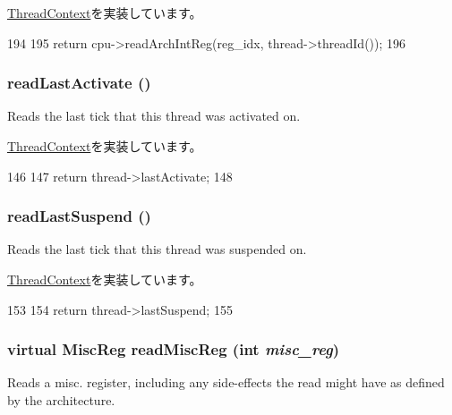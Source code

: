 \hyperlink{classThreadContext_aebc14d23082a9095e0f641a6c5c8b083}{ThreadContext}を実装しています。


\begin{DoxyCode}
194 {
195     return cpu->readArchIntReg(reg_idx, thread->threadId());
196 }
\end{DoxyCode}
\hypertarget{classO3ThreadContext_afaa8f9eb8d809cccd31829ba793a433a}{
\subsubsection[{readLastActivate}]{ readLastActivate ()}}
\label{classO3ThreadContext_afaa8f9eb8d809cccd31829ba793a433a}
Reads the last tick that this thread was activated on. 

\hyperlink{classThreadContext_a99574c7f076a26875232079962cbe522}{ThreadContext}を実装しています。


\begin{DoxyCode}
146 {
147     return thread->lastActivate;
148 }
\end{DoxyCode}
\hypertarget{classO3ThreadContext_a7d0b0631c7087d361f6ae11379c06b15}{
\subsubsection[{readLastSuspend}]{ readLastSuspend ()}}
\label{classO3ThreadContext_a7d0b0631c7087d361f6ae11379c06b15}
Reads the last tick that this thread was suspended on. 

\hyperlink{classThreadContext_affe95ad96bb334a8132f9c69291f39a4}{ThreadContext}を実装しています。


\begin{DoxyCode}
153 {
154     return thread->lastSuspend;
155 }
\end{DoxyCode}
\hypertarget{classO3ThreadContext_a37c9d5a045a0d8da5db34db2dd663d40}{
\subsubsection[{readMiscReg}]{\setlength{\rightskip}{0pt plus 5cm}virtual {\bf MiscReg} readMiscReg (int {\em misc\_\-reg})}}
\label{classO3ThreadContext_a37c9d5a045a0d8da5db34db2dd663d40}
Reads a misc. register, including any side-\/effects the read might have as defined by the architecture. 

